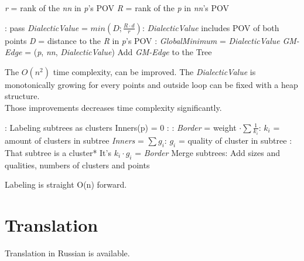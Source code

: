 \documentclass[12pt, a4paper, twocolumn]{article}
\begin{document}
\begin{appendices}
\begin{algorithm}[h]
\begin{algorithmic}[2]
              \State \textit{r} = rank of the \textit{nn} in \textit{p}'s POV
              \State \textit{R} = rank of the \textit{p} in \textit{nn}'s POV
                
              :
                \State pass
              \EndIf
              \State \textit{DialecticValue} = $min(D; \frac{R \cdot d}{r})$:
                \State \indent \textit{DialecticValue} includes POV of both points
                \State \indent \textit{D} = distance to the \textit{R} in \textit{p}'s POV
              :
                \State \textit{GlobalMinimum} = \textit{DialecticValue}
                \State \textit{GM-Edge} = (\textit{p}, \textit{nn}, \textit{DialecticValue})
              \EndIf
            \EndFor
          \EndFor
          \State Add \textit{GM-Edge} to the Tree
        \State
      \EndProcedure
\end{algorithmic}
\end{algorithm}

The $O(n^2)$ time complexity, can be improved. The \textit{DialecticValue} is monotonically growing for every points and outside loop can be fixed with a heap\cite{strHeap} structure.
\\ Those improvements decreases time complexity significantly.

\begin{algorithm}[h]
  \begin{algorithmic}[3]
      
    : \Comment Labeling subtrees as clusters
      \State Inners(p) = 0
      :        
        :
            \State \textit{Border} = weight $\cdot \sum{\frac{1}{k_i}}$:
            \State \indent $k_i$ = amount of clusters in subtree
            \State \textit{Inners} = $\sum{g_i}$:
            \State \indent $g_i$ = quality of cluster in subtree
            :
              \State *That subtree is a cluster*
              \State It's $k_i \cdot g_i $ = \textit{Border}
            \EndIf
        \EndFor
        \State Merge subtrees: 
        \State \indent Add sizes and qualities, numbers of clusters and points
      \EndFor
    \EndProcedure
  \end{algorithmic}
\end{algorithm}

Labeling is straight O(n) forward.
\section{Translation}
Translation in Russian is available\cite{Druhg_ru}.
\end{appendices}
\end{document}
